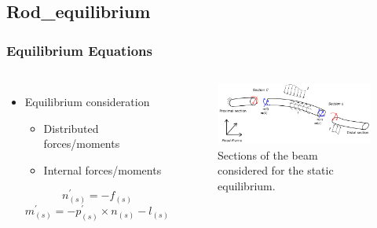 \documentclass[compress]{thesisbeamer}
\begin{document}
        \subsection{Rod_equilibrium}
        \begin{frame}
        	\frametitle{Equilibrium Equations}
			\begin{columns}
			\begin{itemize}%
  				\item Equilibrium consideration
  				\begin{itemize}%
   					\item Distributed forces/moments
   					\item Internal forces/moments
  				\end{itemize}
  				\begin{equation}
  					{n}_{(s)}^{'} = - {f}_{(s)}
  				\end{equation}
  				\begin{equation}
  					{m}_{(s)}^{'} = - {p}_{(s)}^{'} × {n}_{(s)} - {l}_{(s)}
  				\end{equation}
 			\end{itemize}
			\vspace{2cm}
			\begin{figure}[h]
				\centering
				\includegraphics[width=\textwidth]{images/equilibrium}
				\caption{Sections of the beam considered for the static equilibrium.}
			\end{figure}
			\end{columns}
		\end{frame}
\end{document}
